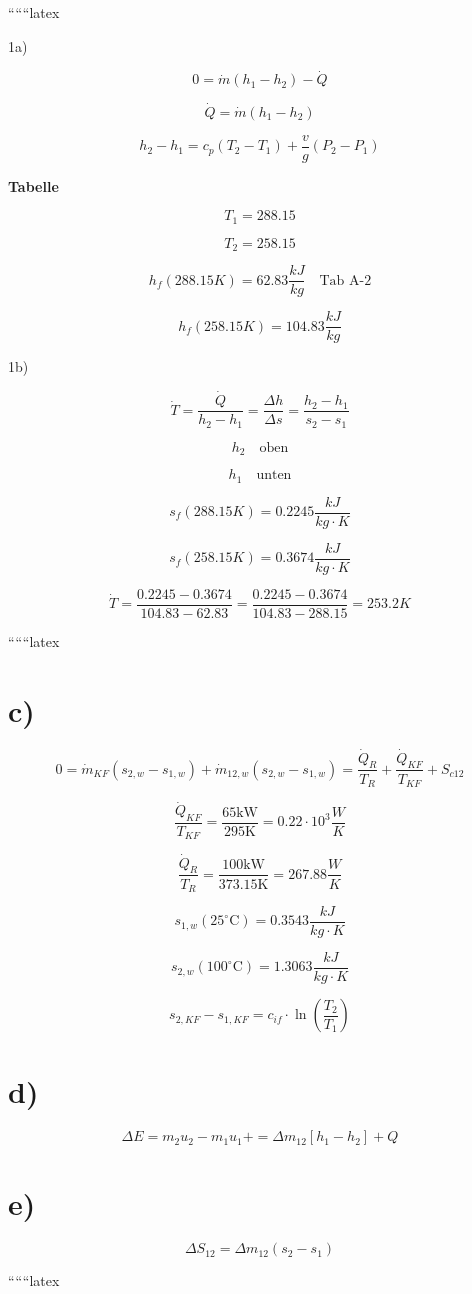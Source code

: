 
``````latex


1a)

\[
0 = \dot{m} (h_1 - h_2) - \dot{Q}
\]

\[
\dot{Q} = \dot{m} (h_1 - h_2)
\]

\[
h_2 - h_1 = c_p (T_2 - T_1) + \frac{v}{g} (P_2 - P_1)
\]

\textbf{Tabelle}

\[
T_1 = 288.15
\]

\[
T_2 = 258.15
\]

\[
h_f (288.15 K) = 62.83 \frac{kJ}{kg} \quad \text{Tab A-2}
\]

\[
h_f (258.15 K) = 104.83 \frac{kJ}{kg}
\]

1b)

\[
\dot{T} = \frac{\dot{Q}}{h_2 - h_1} = \frac{\Delta h}{\Delta s} = \frac{h_2 - h_1}{s_2 - s_1}
\]

\[
h_2 \quad \text{oben}
\]

\[
h_1 \quad \text{unten}
\]

\[
s_f (288.15 K) = 0.2245 \frac{kJ}{kg \cdot K}
\]

\[
s_f (258.15 K) = 0.3674 \frac{kJ}{kg \cdot K}
\]

\[
\dot{T} = \frac{0.2245 - 0.3674}{104.83 - 62.83} = \frac{0.2245 - 0.3674}{104.83 - 288.15} = 253.2 K
\]

``````latex

\section*{c)}

\[
0 = \dot{m}_{KF} \left( s_{2,w} - s_{1,w} \right) + \dot{m}_{12,w} \left( s_{2,w} - s_{1,w} \right) = \frac{\dot{Q}_R}{T_R} + \frac{\dot{Q}_{KF}}{T_{KF}} + S_{c12}
\]

\[
\frac{\dot{Q}_{KF}}{T_{KF}} = \frac{65 \text{kW}}{295 \text{K}} = 0.22 \cdot 10^3 \frac{W}{K}
\]

\[
\frac{\dot{Q}_R}{T_R} = \frac{100 \text{kW}}{373.15 \text{K}} = 267.88 \frac{W}{K}
\]

\[
s_{1,w} \left( 25^\circ \text{C} \right) = 0.3543 \frac{kJ}{kg \cdot K}
\]

\[
s_{2,w} \left( 100^\circ \text{C} \right) = 1.3063 \frac{kJ}{kg \cdot K}
\]

\[
s_{2, KF} - s_{1, KF} = c_{if} \cdot \ln \left( \frac{T_2}{T_1} \right)
\]

\section*{d)}

\[
\Delta E = m_2 u_2 - m_1 u_1 + = \Delta m_{12} \left[ h_1 - h_2 \right] + Q
\]

\section*{e)}

\[
\Delta S_{12} = \Delta m_{12} \left( s_2 - s_1 \right)
\]

``````latex


